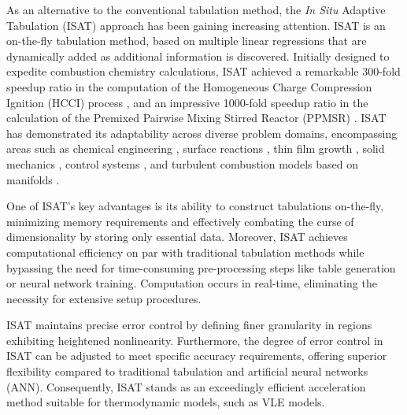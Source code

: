 
As an alternative to the conventional tabulation method, the \textit{In Situ} Adaptive Tabulation (ISAT) \cite{pope1997computationally} approach has been gaining increasing attention. ISAT is an on-the-fly tabulation method, based on multiple linear regressions that are dynamically added as additional information is discovered. Initially designed to expedite combustion chemistry calculations, ISAT achieved a remarkable 300-fold speedup ratio in the computation of the Homogeneous Charge Compression Ignition (HCCI) process \cite{contino2011coupling}, and an impressive 1000-fold speedup ratio in the calculation of the Premixed Pairwise Mixing Stirred Reactor (PPMSR) \cite{yang1998treating}. ISAT has demonstrated its adaptability across diverse problem domains, encompassing areas such as chemical engineering \cite{shah1999computational,kolhapure2005pdf,10.1115/1.2709655}, surface reactions \cite{mazumder2005adaptation}, thin film growth \cite{varshney2005multiscale}, solid mechanics \cite{arsenlis2006generalized}, control systems \cite{hedengren2008approximate}, and turbulent combustion models based on manifolds \cite{lacey2021situ}.

One of ISAT's key advantages is its ability to construct tabulations on-the-fly, minimizing memory requirements and effectively combating the curse of dimensionality by storing only essential data. Moreover, ISAT achieves computational efficiency on par with traditional tabulation methods while bypassing the need for time-consuming pre-processing steps like table generation or neural network training. Computation occurs in real-time, eliminating the necessity for extensive setup procedures.

ISAT maintains precise error control by defining finer granularity in regions exhibiting heightened nonlinearity. Furthermore, the degree of error control in ISAT can be adjusted to meet specific accuracy requirements, offering superior flexibility compared to traditional tabulation and artificial neural networks (ANN). Consequently, ISAT stands as an exceedingly efficient acceleration method suitable for thermodynamic models, such as VLE models.

